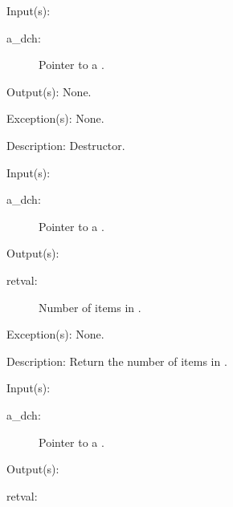 \begin{capi}
\label{dch_delete}
	\begin{capilist}
	\item[Input(s): ]
		\begin{description}\item[]
		\item[a\_dch: ]
			Pointer to a .
		\end{description}
	\item[Output(s): ] None.
	\item[Exception(s): ] None.
	\item[Description: ]
		Destructor.
	\end{capilist}
\label{dch_count}
	\begin{capilist}
	\item[Input(s): ]
		\begin{description}\item[]
		\item[a\_dch: ]
			Pointer to a \classname{dch}.
		\end{description}
	\item[Output(s): ]
		\begin{description}\item[]
		\item[retval: ]
			Number of items in \cvar{a\_dch}.
		\end{description}
	\item[Exception(s): ] None.
	\item[Description: ]
		Return the number of items in \cvar{a\_dch}.
	\end{capilist}
\label{dch_shrinkable_get}
	\begin{capilist}
	\item[Input(s): ]
		\begin{description}\item[]
		\item[a\_dch: ]
			Pointer to a .
		\end{description}
	\item[Output(s): ]
		\begin{description}\item[]
		\item[retval: ]
			\begin{description}\item[]

\end{description}
\end{description}
\end{capilist}
\end{capi}
